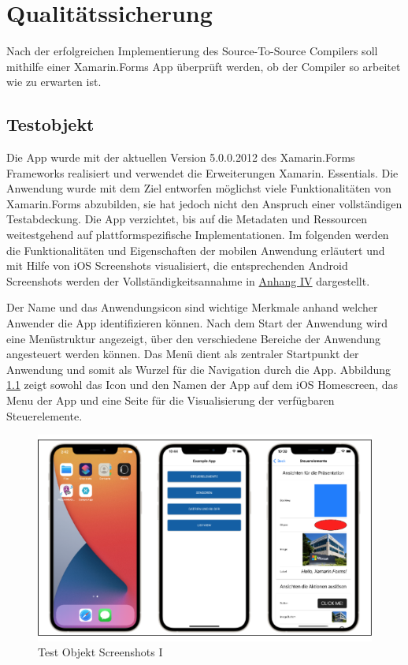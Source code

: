 \chapter{Qualitätssicherung}
\label{chap:Qualitätssicherung}

Nach der erfolgreichen Implementierung des Source-To-Source Compilers soll mithilfe einer Xamarin.Forms App überprüft werden,  ob der Compiler so arbeitet wie zu erwarten ist.  

\section{Testobjekt}
Die App wurde mit der aktuellen Version 5.0.0.2012 des Xamarin.Forms Frameworks realisiert und verwendet die Erweiterungen Xamarin. Essentials.  Die Anwendung wurde mit dem Ziel entworfen möglichst viele Funktionalitäten von Xamarin.Forms abzubilden,  sie hat jedoch nicht den Anspruch einer vollständigen Testabdeckung.  Die App verzichtet, bis auf die Metadaten und Ressourcen weitestgehend auf plattformspezifische Implementationen. Im folgenden werden die Funktionalitäten und Eigenschaften der mobilen Anwendung erläutert und mit Hilfe von iOS Screenshots visualisiert,  die entsprechenden Android Screenshots werden der Vollständigkeitsannahme in \hyperref[chap:AnhangAndroidScreenshots]{Anhang IV} dargestellt.

Der Name und das Anwendungsicon sind wichtige Merkmale anhand welcher Anwender die App identifizieren können.  Nach dem Start der Anwendung wird eine  Menüstruktur angezeigt,  über den verschiedene Bereiche der Anwendung angesteuert werden können.  Das Menü dient als zentraler Startpunkt der Anwendung und somit als Wurzel für die Navigation durch die App.  Abbildung \ref{fig:TestObjectI} zeigt sowohl das Icon und den Namen der App auf dem iOS Homescreen,  das Menu der App und eine Seite für die Visualisierung der verfügbaren Steuerelemente.
\newpage
\begin{figure}[!ht]
 \includegraphics[width=\textwidth,keepaspectratio]{Images/Screenshot/AppIconAndMenu.png}
 \caption{Test Objekt Screenshots I}
 \label{fig:TestObjectI}
\end{figure}

